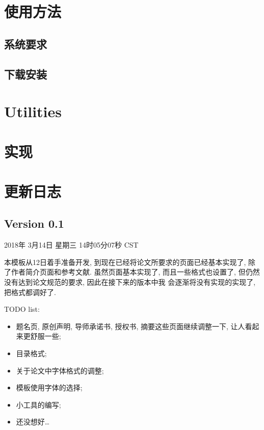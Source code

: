 \documentclass[masterpronofulltime]{cugthesis}
\begin{document}
\chapter{使用方法}

\section{系统要求}
\label{sec:xi_tong_yao_qiu_}

\section{下载安装}
\label{sec:xia_zai_an_zhuang_}



\chapter{Utilities}

\chapter{实现}

\chapter{更新日志}

\section{Version 0.1}
\label{sec:version_0_1}

2018年 3月14日 星期三 14时05分07秒 CST

本模板从12日着手准备开发, 到现在已经将论文所要求的页面已经基本实现了, 除了作者简介页面和参考文献.
虽然页面基本实现了, 而且一些格式也设置了, 但仍然没有达到论文规范的要求, 因此在接下来的版本中我
会逐渐将没有实现的实现了, 把格式都调好了.

TODO list:
\begin{itemize}
    \item 题名页, 原创声明, 导师承诺书, 授权书, 摘要这些页面继续调整一下, 让人看起来更舒服一些;
    \item 目录格式;
    \item 关于论文中字体格式的调整;
    \item 模板使用字体的选择;
    \item 小工具的编写;
    \item 还没想好\dots
\end{itemize}
\end{document}
